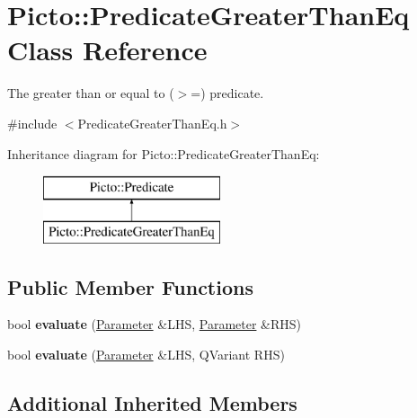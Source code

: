 \hypertarget{class_picto_1_1_predicate_greater_than_eq}{\section{Picto\-:\-:Predicate\-Greater\-Than\-Eq Class Reference}
\label{class_picto_1_1_predicate_greater_than_eq}
}


The greater than or equal to ($>$=) predicate.  




{\ttfamily \#include $<$Predicate\-Greater\-Than\-Eq.\-h$>$}

Inheritance diagram for Picto\-:\-:Predicate\-Greater\-Than\-Eq\-:\begin{figure}[H]
\begin{center}
\leavevmode
\includegraphics[height=2.000000cm]{class_picto_1_1_predicate_greater_than_eq}
\end{center}
\end{figure}
\subsection*{Public Member Functions}
\begin{DoxyCompactItemize}
\item 
\hypertarget{class_picto_1_1_predicate_greater_than_eq_a11c0185992ec3f96d75f2f080734f6e7}{bool {\bfseries evaluate} (\hyperlink{class_picto_1_1_parameter}{Parameter} \&L\-H\-S, \hyperlink{class_picto_1_1_parameter}{Parameter} \&R\-H\-S)}\label{class_picto_1_1_predicate_greater_than_eq_a11c0185992ec3f96d75f2f080734f6e7}

\item 
\hypertarget{class_picto_1_1_predicate_greater_than_eq_a6b346c69e46a891f0d3bec0d0009fc18}{bool {\bfseries evaluate} (\hyperlink{class_picto_1_1_parameter}{Parameter} \&L\-H\-S, Q\-Variant R\-H\-S)}\label{class_picto_1_1_predicate_greater_than_eq_a6b346c69e46a891f0d3bec0d0009fc18}

\end{DoxyCompactItemize}
\subsection*{Additional Inherited Members}


